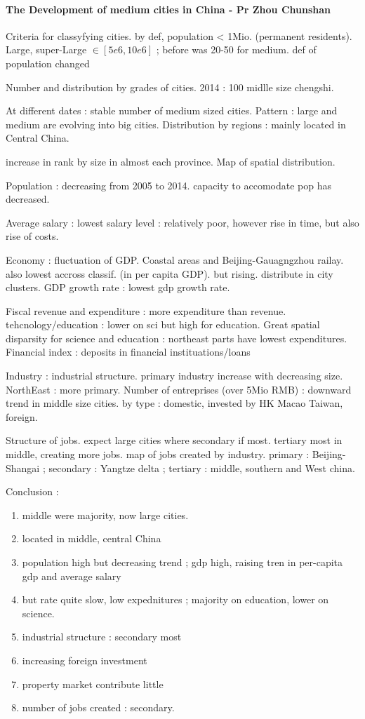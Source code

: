 \paragraph{The Development of medium cities in China - Pr Zhou Chunshan}

Criteria for classyfying cities. by def, population < 1Mio. (permanent residents). Large, super-Large $\in [5e6,10e6]$ ; before was 20-50 for medium. def of population changed

Number and distribution by grades of cities. 2014 : 100 midlle size chengshi. 

At different dates : stable number of medium sized cities. Pattern : large and medium are evolving into big cities.
Distribution by regions : mainly located in Central China.

increase in rank by size in almost each province.
Map of spatial distribution.

Population : decreasing from 2005 to 2014. capacity to accomodate pop has decreased.

Average salary : lowest salary level : relatively poor, however rise in time, but also rise of costs.

Economy : fluctuation of GDP. Coastal areas and Beijing-Gauagngzhou railay. also lowest accross classif. (in per capita GDP). but rising. distribute in city clusters.
GDP growth rate : lowest gdp growth rate.

Fiscal revenue and expenditure : more expenditure than revenue.
tehcnology/education : lower on sci but high for education. Great spatial disparsity for science and education : northeast parts have lowest expenditures.
Financial index : deposits in financial instituations/loans

Industry : industrial structure. primary industry increase with decreasing size. NorthEast : more primary. 
Number of entreprises (over 5Mio RMB) : downward trend in middle size cities. by type : domestic, invested by HK Macao Taiwan, foreign.

Structure of jobs. expect large cities where secondary if most. tertiary most in middle, creating more jobs. map of jobs created by industry. primary : Beijing-Shangai ; secondary : Yangtze delta ; tertiary : middle, southern and West china.

Conclusion :
\begin{enumerate}
\item middle were majority, now large cities.
\item located in middle, central China
\item population high but decreasing trend ; gdp high, raising tren in per-capita gdp and average salary
\item but rate quite slow, low expednitures ; majority on education, lower on science.
\item industrial structure : secondary most
\item increasing foreign investment
\item property market contribute little
\item number of jobs created : secondary.
\end{enumerate}

